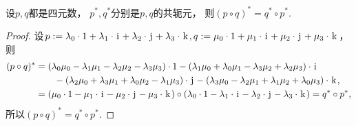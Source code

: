 \begin{property}
设\(p,q\)都是四元数，
\(p^*,q^*\)分别是\(p,q\)的共轭元，
则\((p \circ q)^* = q^* \circ p^*\).
\begin{proof}
设\(
	p
	:=
	\lambda_0 \cdot 1
	+ \lambda_1 \cdot \kern1pt\mathrm{i}\kern1pt
	+ \lambda_2 \cdot \kern1pt\mathrm{j}\kern1pt
	+ \lambda_3 \cdot \kern1pt\mathrm{k}\kern1pt,
	q
	:=
	\mu_0 \cdot 1
	+ \mu_1 \cdot \kern1pt\mathrm{i}\kern1pt
	+ \mu_2 \cdot \kern1pt\mathrm{j}\kern1pt
	+ \mu_3 \cdot \kern1pt\mathrm{k}\kern1pt
\)，
则\begin{align*}
	(p \circ q)^*
	&=
	(\lambda_0 \mu_0 - \lambda_1 \mu_1 - \lambda_2 \mu_2 - \lambda_3 \mu_3) \cdot 1
		- (\lambda_1 \mu_0 + \lambda_0 \mu_1 - \lambda_3 \mu_2 + \lambda_2 \mu_3) \cdot \kern1pt\mathrm{i}\kern1pt \\
	&\hspace{20pt}
		- (\lambda_2 \mu_0 + \lambda_3 \mu_1 + \lambda_0 \mu_2 - \lambda_1 \mu_3) \cdot \kern1pt\mathrm{j}\kern1pt
		- (\lambda_3 \mu_0 - \lambda_2 \mu_1 + \lambda_1 \mu_2 + \lambda_0 \mu_3) \cdot \kern1pt\mathrm{k}\kern1pt, \\
	&= (
		\mu_0 \cdot 1
		- \mu_1 \cdot \kern1pt\mathrm{i}\kern1pt
		- \mu_2 \cdot \kern1pt\mathrm{j}\kern1pt
		- \mu_3 \cdot \kern1pt\mathrm{k}\kern1pt
	) \circ (
		\lambda_0 \cdot 1
		- \lambda_1 \cdot \kern1pt\mathrm{i}\kern1pt
		- \lambda_2 \cdot \kern1pt\mathrm{j}\kern1pt
		- \lambda_3 \cdot \kern1pt\mathrm{k}\kern1pt
	)
	= q^* \circ p^*,
\end{align*}
所以\((p \circ q)^* = q^* \circ p^*\).
\end{proof}
\end{property}

